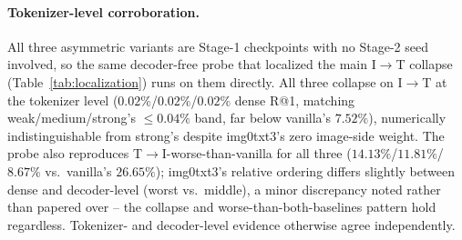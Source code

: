 \paragraph{Tokenizer-level corroboration.} All three asymmetric variants are Stage-1 checkpoints with no Stage-2 seed involved, so the same decoder-free probe that localized the main I$\to$T collapse (Table~\ref{tab:localization}) runs on them directly. All three collapse on I$\to$T at the tokenizer level ($0.02\%$/$0.02\%$/$0.02\%$ dense R@1, matching weak/medium/strong's $\leq0.04\%$ band, far below vanilla's $7.52\%$), numerically indistinguishable from strong's despite img0txt3's zero image-side weight. The probe also reproduces T$\to$I-worse-than-vanilla for all three ($14.13\%$/$11.81\%$/$8.67\%$ vs.\ vanilla's $26.65\%$); img0txt3's relative ordering differs slightly between dense and decoder-level (worst vs.\ middle), a minor discrepancy noted rather than papered over -- the collapse and worse-than-both-baselines pattern hold regardless. Tokenizer- and decoder-level evidence otherwise agree independently.
